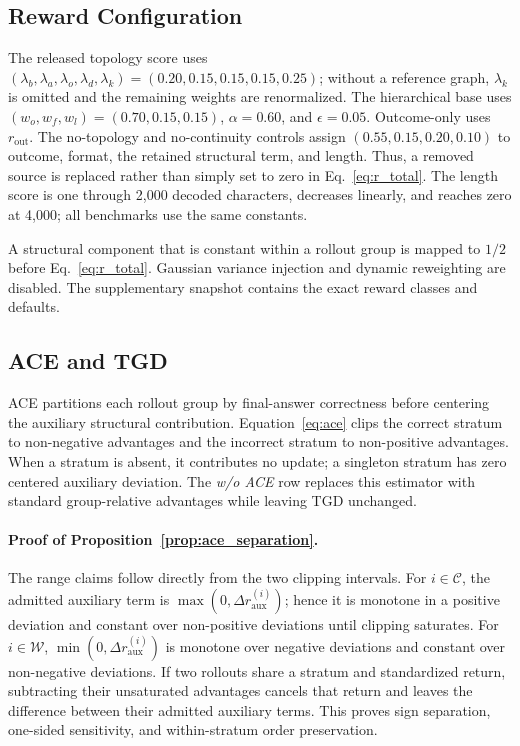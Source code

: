 \subsection{Reward Configuration}
\label{app:reward_config}
The released topology score uses $(\lambda_b,\lambda_a,\lambda_o,\lambda_d,\lambda_k)=(0.20,0.15,0.15,0.15,0.25)$; without a reference graph, $\lambda_k$ is omitted and the remaining weights are renormalized. The hierarchical base uses $(w_o,w_f,w_l)=(0.70,0.15,0.15)$, $\alpha=0.60$, and $\epsilon=0.05$. Outcome-only uses $r_{\mathrm{out}}$. The no-topology and no-continuity controls assign $(0.55,0.15,0.20,0.10)$ to outcome, format, the retained structural term, and length. Thus, a removed source is replaced rather than simply set to zero in Eq.~\ref{eq:r_total}. The length score is one through 2{,}000 decoded characters, decreases linearly, and reaches zero at 4{,}000; all benchmarks use the same constants.

A structural component that is constant within a rollout group is mapped to $1/2$ before Eq.~\ref{eq:r_total}. Gaussian variance injection and dynamic reweighting are disabled. The supplementary snapshot contains the exact reward classes and defaults.

\subsection{ACE and TGD}
\label{app:ace_proof}
ACE partitions each rollout group by final-answer correctness before centering the auxiliary structural contribution. Equation~\ref{eq:ace} clips the correct stratum to non-negative advantages and the incorrect stratum to non-positive advantages. When a stratum is absent, it contributes no update; a singleton stratum has zero centered auxiliary deviation. The \emph{w/o ACE} row replaces this estimator with standard group-relative advantages while leaving TGD unchanged.

\paragraph{Proof of Proposition~\ref{prop:ace_separation}.}
The range claims follow directly from the two clipping intervals. For $i\in\mathcal C$, the admitted auxiliary term is $\max(0,\Delta r_{\mathrm{aux}}^{(i)})$; hence it is monotone in a positive deviation and constant over non-positive deviations until clipping saturates. For $i\in\mathcal W$, $\min(0,\Delta r_{\mathrm{aux}}^{(i)})$ is monotone over negative deviations and constant over non-negative deviations. If two rollouts share a stratum and standardized return, subtracting their unsaturated advantages cancels that return and leaves the difference between their admitted auxiliary terms. This proves sign separation, one-sided sensitivity, and within-stratum order preservation.

